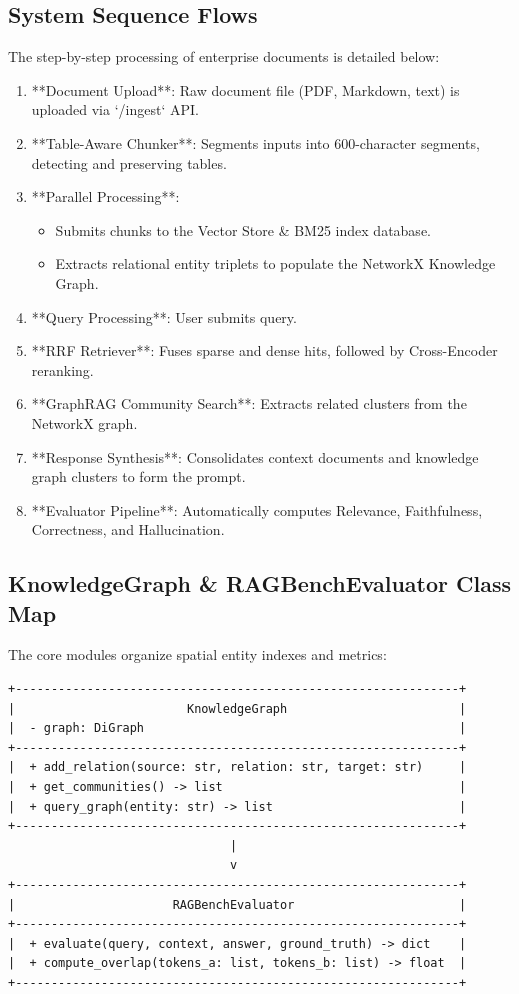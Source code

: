 \documentclass[11pt,journal,onecolumn]{IEEEtran}
\begin{document}
\subsection{System Sequence Flows}
The step-by-step processing of enterprise documents is detailed below:
\begin{enumerate}
    \item **Document Upload**: Raw document file (PDF, Markdown, text) is uploaded via `/ingest` API.
    \item **Table-Aware Chunker**: Segments inputs into 600-character segments, detecting and preserving tables.
    \item **Parallel Processing**: 
    \begin{itemize}
        \item Submits chunks to the Vector Store \& BM25 index database.
        \item Extracts relational entity triplets to populate the NetworkX Knowledge Graph.
    \end{itemize}
    \item **Query Processing**: User submits query.
    \item **RRF Retriever**: Fuses sparse and dense hits, followed by Cross-Encoder reranking.
    \item **GraphRAG Community Search**: Extracts related clusters from the NetworkX graph.
    \item **Response Synthesis**: Consolidates context documents and knowledge graph clusters to form the prompt.
    \item **Evaluator Pipeline**: Automatically computes Relevance, Faithfulness, Correctness, and Hallucination.
\end{enumerate}

\subsection{KnowledgeGraph \& RAGBenchEvaluator Class Map}
The core modules organize spatial entity indexes and metrics:
\begin{verbatim}
+--------------------------------------------------------------+
|                        KnowledgeGraph                        |
|  - graph: DiGraph                                            |
+--------------------------------------------------------------+
|  + add_relation(source: str, relation: str, target: str)     |
|  + get_communities() -> list                                 |
|  + query_graph(entity: str) -> list                          |
+--------------------------------------------------------------+
                               |
                               v
+--------------------------------------------------------------+
|                      RAGBenchEvaluator                       |
+--------------------------------------------------------------+
|  + evaluate(query, context, answer, ground_truth) -> dict    |
|  + compute_overlap(tokens_a: list, tokens_b: list) -> float  |
+--------------------------------------------------------------+
\end{verbatim}
\end{document}
